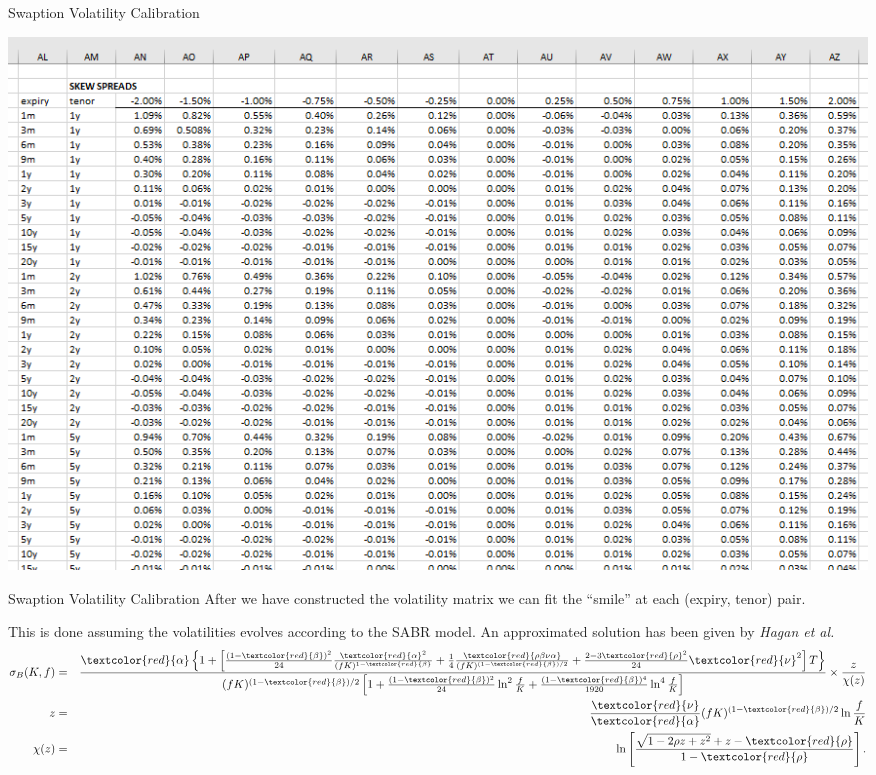 \documentclass{beamer}
\begin{document}
\begin{frame}{Swaption Volatility Calibration}
  \begin{center}
    \includegraphics[width=1.\linewidth]{skews}
  \end{center}
\end{frame}

\begin{frame}{Swaption Volatility Calibration}
  After we have constructed the volatility matrix we can fit the ``smile'' at each (expiry, tenor) pair.

  This is done assuming the volatilities evolves according to the SABR model. An approximated solution has been given by \emph{Hagan et al.}
  \begin{eqnarray} \sigma _{B}(K,f) &=&\frac{\textcolor{red}{\alpha} \left\{ 1+\left[ \frac{\left( 1-\textcolor{red}{\beta} \right) ^{2}}{24}\frac{\textcolor{red}{\alpha} ^{2}}{(fK)^{1-\textcolor{red}{\beta}}}+\frac{1}{4}\frac{\textcolor{red}{\rho \beta \nu\alpha}}{(fK)^{(1-\textcolor{red}{\beta})/2}}+\frac{2-3\textcolor{red}{\rho} ^{2}}{24}\textcolor{red}{\nu}^{2}\right] T\right\} }{(fK)^{(1-\textcolor{red}{\beta})/2}\left[ 1+\frac{(1-\textcolor{red}{\beta})^{2}}{24}\ln ^{2} \frac{f}{K}+\frac{(1-\textcolor{red}{\beta})^{4}}{1920}\ln^{4}\frac{f}{K}\right] } \times \frac{z}{\chi (z)} \notag \\ z &=&\frac{\textcolor{red}{\nu}}{\textcolor{red}{\alpha}}(fK)^{(1-\textcolor{red}{\beta})/2}\ln \frac{f}{K} \notag \\ \chi (z) &=&\ln \left[ \frac{\sqrt{1-2\rho z+z^{2}}+z-\textcolor{red}{\rho}}{1-\textcolor{red}{\rho}}\right] . \notag \end{eqnarray}
\end{frame}
\end{document}
